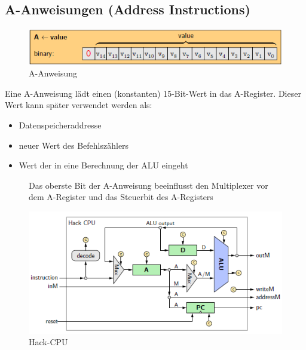 \documentclass[12pt]{report}
\begin{document}
\subsection{A-Anweisungen (Address Instructions)}

\begin{figure}[H]
  \caption{A-Anweisung}
  \label{fig:maschinensprache_a-anweisung}
  \centering
  \includegraphics{maschinensprache_a-anweisung}
\end{figure}

Eine A-Anweisung lädt einen (konstanten) 15-Bit-Wert in das A-Register.
Dieser Wert kann später verwendet werden als:
\begin{itemize}
  \item Datenspeicheraddresse
  \item neuer Wert des Befehlszählers
  \item Wert der in eine Berechnung der ALU eingeht
\end{itemize}


\begin{figure}[H]
  \begin{minipage}[t]{0.45\textwidth}
    Das oberste Bit der A-Anweisung beeinflusst den Multiplexer vor dem A-Register und das Steuerbit des A-Registers
  \end{minipage}
  \hfill
  \begin{minipage}[t]{0.45\textwidth}
    \caption{Hack-CPU}
    \label{fig:hack_cpu_leitungen}
    \centering
    \includegraphics[width=\textwidth]{hack_cpu_leitungen}
  \end{minipage}
\end{figure}
\end{document}
